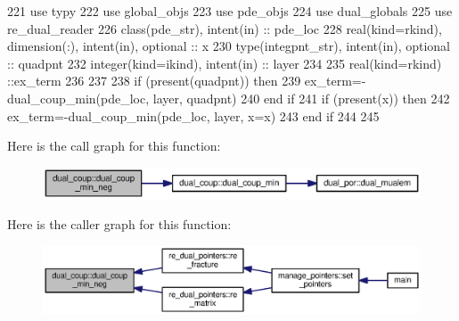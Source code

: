\begin{DoxyCode}
221       \textcolor{keywordtype}{use }typy
222       \textcolor{keywordtype}{use }global_objs
223       \textcolor{keywordtype}{use }pde_objs
224       \textcolor{keywordtype}{use }dual_globals
225       \textcolor{keywordtype}{use }re_dual_reader
226       \textcolor{keywordtype}{class}(pde_str), \textcolor{keywordtype}{intent(in)} :: pde\_loc
228       \textcolor{keywordtype}{real(kind=rkind)}, \textcolor{keywordtype}{dimension(:)}, \textcolor{keywordtype}{intent(in)}, \textcolor{keywordtype}{optional}    :: x
230       \textcolor{keywordtype}{type}(integpnt_str), \textcolor{keywordtype}{intent(in)}, \textcolor{keywordtype}{optional} :: quadpnt
232       \textcolor{keywordtype}{integer(kind=ikind)}, \textcolor{keywordtype}{intent(in)} :: layer
234 
235       \textcolor{keywordtype}{real(kind=rkind)}   ::ex\_term
236           
237             
238       \textcolor{keywordflow}{if} (\textcolor{keyword}{present}(quadpnt)) \textcolor{keywordflow}{then}
239         ex\_term=-dual\_coup\_min(pde\_loc, layer, quadpnt)
240 \textcolor{keywordflow}{      end if}
241       \textcolor{keywordflow}{if} (\textcolor{keyword}{present}(x)) \textcolor{keywordflow}{then}
242         ex\_term=-dual\_coup\_min(pde\_loc, layer, x=x)
243 \textcolor{keywordflow}{      end if}
244 
245      
\end{DoxyCode}


Here is the call graph for this function\+:
\nopagebreak
\begin{figure}[H]
\begin{center}
\leavevmode
\includegraphics[width=350pt]{namespacedual__coup_a61aa217a5b2540a81820d9c213f50056_cgraph}
\end{center}
\end{figure}




Here is the caller graph for this function\+:\nopagebreak
\begin{figure}[H]
\begin{center}
\leavevmode
\includegraphics[width=350pt]{namespacedual__coup_a61aa217a5b2540a81820d9c213f50056_icgraph}
\end{center}
\end{figure}


